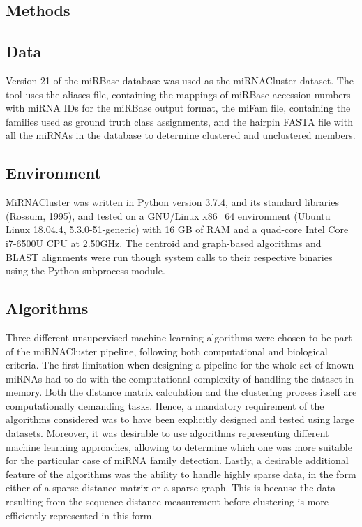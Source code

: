 \documentclass[nocrop]{bioinfo}
\begin{document}
\begin{methods}
\section{Methods}

\subsection{Data}
Version 21 of the miRBase database was used as the miRNACluster dataset. The tool uses the aliases file, containing the mappings of miRBase accession numbers with miRNA IDs for the miRBase output format, the miFam file, containing the families used as ground truth class assignments, and the hairpin FASTA file with all the miRNAs in the database to determine clustered and unclustered members.

\subsection{Environment}
MiRNACluster was written in Python version 3.7.4, and its standard libraries (Rossum, 1995), and tested on a GNU/Linux x86\_64 environment (Ubuntu Linux 18.04.4, 5.3.0-51-generic) with 16 GB of RAM and a quad-core Intel Core i7-6500U CPU at 2.50GHz. The centroid and graph-based algorithms and BLAST alignments were run though system calls to their respective binaries using the Python subprocess module.

\subsection{Algorithms}
Three different unsupervised machine learning algorithms were chosen to be part of the miRNACluster pipeline, following both computational and biological criteria. The first limitation when designing a pipeline for the whole set of known miRNAs had to do with the computational complexity of handling the dataset in memory. Both the distance matrix calculation and the clustering process itself are computationally demanding tasks. Hence, a mandatory requirement of the algorithms considered was to have been explicitly designed and tested using large datasets. Moreover, it was desirable to use algorithms representing different machine learning approaches, allowing to determine which one was more suitable for the particular case of miRNA family detection. Lastly, a desirable additional feature of the algorithms was the ability to handle highly sparse data, in the form either of a sparse distance matrix or a sparse graph. This is because the data resulting from the sequence distance measurement before clustering is more efficiently represented in this form.


\end{methods}
\end{document}

